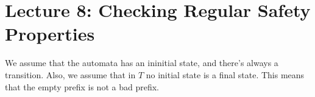 \chapter{Lecture 8: Checking Regular Safety Properties}

We assume that the automata has an ininitial state, and there's always a transition.
Also, we assume that in $T$ no initial state is a final state. This means that the empty prefix is not a bad prefix.





